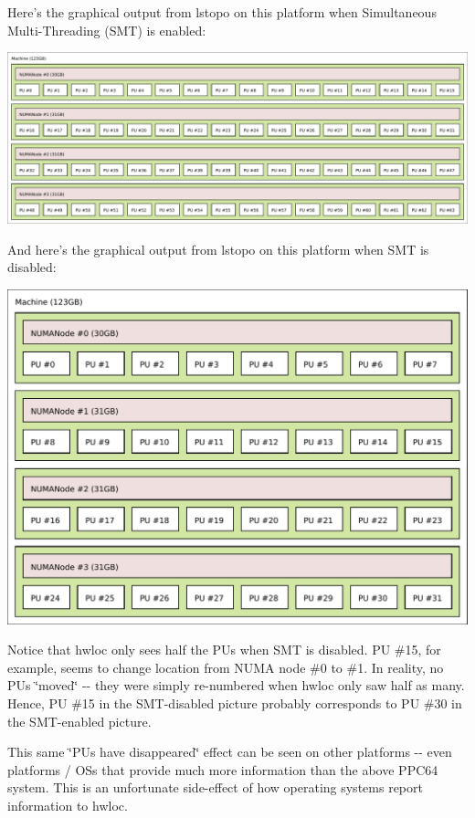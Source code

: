 Here's the graphical output from lstopo on this platform when Simultaneous Multi-\/Threading (SMT) is enabled:

 
\begin{DoxyImageNoCaption}
  \mbox{\includegraphics[width=\textwidth]{ppc64-with-smt}}
\end{DoxyImageNoCaption}


And here's the graphical output from lstopo on this platform when SMT is disabled:

 
\begin{DoxyImageNoCaption}
  \mbox{\includegraphics[width=\textwidth]{ppc64-without-smt}}
\end{DoxyImageNoCaption}


Notice that hwloc only sees half the PUs when SMT is disabled. PU \#15, for example, seems to change location from NUMA node \#0 to \#1. In reality, no PUs \char`\"{}moved\char`\"{} -\/-\/ they were simply re-\/numbered when hwloc only saw half as many. Hence, PU \#15 in the SMT-\/disabled picture probably corresponds to PU \#30 in the SMT-\/enabled picture.

This same \char`\"{}PUs have disappeared\char`\"{} effect can be seen on other platforms -\/-\/ even platforms / OSs that provide much more information than the above PPC64 system. This is an unfortunate side-\/effect of how operating systems report information to hwloc.

